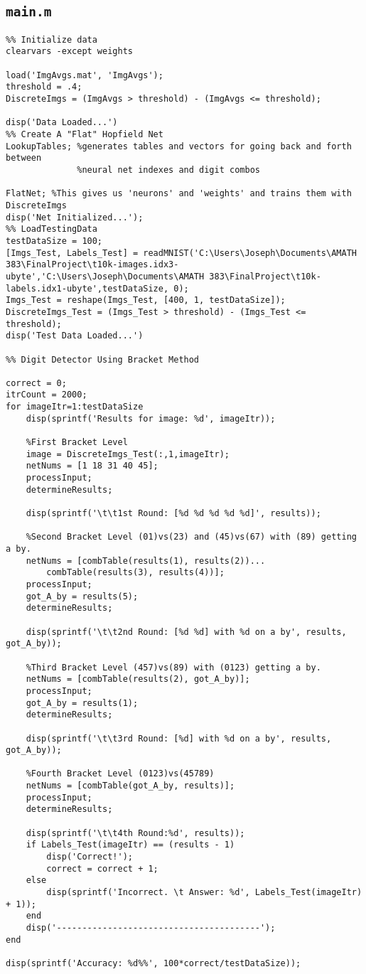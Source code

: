 \documentclass[]{article}
\theoremstyle{plain}
\theoremstyle{definition}
\begin{document}
\subsection{\texttt{main.m} }
\singlespacing
\begin{verbatim}
%% Initialize data
clearvars -except weights 

load('ImgAvgs.mat', 'ImgAvgs');
threshold = .4;
DiscreteImgs = (ImgAvgs > threshold) - (ImgAvgs <= threshold);

disp('Data Loaded...')
%% Create A "Flat" Hopfield Net
LookupTables; %generates tables and vectors for going back and forth between
              %neural net indexes and digit combos

FlatNet; %This gives us 'neurons' and 'weights' and trains them with DiscreteImgs
disp('Net Initialized...');
%% LoadTestingData
testDataSize = 100;
[Imgs_Test, Labels_Test] = readMNIST('C:\Users\Joseph\Documents\AMATH 383\FinalProject\t10k-images.idx3-ubyte','C:\Users\Joseph\Documents\AMATH 383\FinalProject\t10k-labels.idx1-ubyte',testDataSize, 0);
Imgs_Test = reshape(Imgs_Test, [400, 1, testDataSize]);
DiscreteImgs_Test = (Imgs_Test > threshold) - (Imgs_Test <= threshold);
disp('Test Data Loaded...')

%% Digit Detector Using Bracket Method

correct = 0;
itrCount = 2000;
for imageItr=1:testDataSize
    disp(sprintf('Results for image: %d', imageItr));
    
    %First Bracket Level    
    image = DiscreteImgs_Test(:,1,imageItr);
    netNums = [1 18 31 40 45];
    processInput;
    determineResults;

    disp(sprintf('\t\t1st Round: [%d %d %d %d %d]', results));
    
    %Second Bracket Level (01)vs(23) and (45)vs(67) with (89) getting a by.
    netNums = [combTable(results(1), results(2))...
        combTable(results(3), results(4))];
    processInput;
    got_A_by = results(5);
    determineResults;
    
    disp(sprintf('\t\t2nd Round: [%d %d] with %d on a by', results, got_A_by));
    
    %Third Bracket Level (457)vs(89) with (0123) getting a by.
    netNums = [combTable(results(2), got_A_by)];
    processInput;
    got_A_by = results(1);
    determineResults;
    
    disp(sprintf('\t\t3rd Round: [%d] with %d on a by', results, got_A_by));
        
    %Fourth Bracket Level (0123)vs(45789)
    netNums = [combTable(got_A_by, results)];
    processInput;
    determineResults;
    
    disp(sprintf('\t\t4th Round:%d', results));
    if Labels_Test(imageItr) == (results - 1)
        disp('Correct!');
        correct = correct + 1;
    else
        disp(sprintf('Incorrect. \t Answer: %d', Labels_Test(imageItr) + 1));
    end
    disp('----------------------------------------');
end

disp(sprintf('Accuracy: %d%%', 100*correct/testDataSize));
\end{verbatim}
\end{document}
